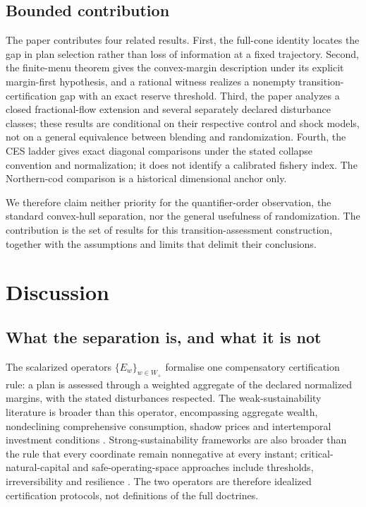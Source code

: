 \documentclass[preprint,11pt,authoryear]{elsarticle}
\theoremstyle{definition}
\theoremstyle{remark}
\newcommand{\Wp}{W_+}
\begin{document}
\subsection{Bounded contribution}

The paper contributes four related results. First, the full-cone identity locates the gap in plan selection rather than loss of information at a fixed trajectory. Second, the finite-menu theorem gives the convex-margin description under its explicit margin-first hypothesis, and a rational witness realizes a nonempty transition-certification gap with an exact reserve threshold. Third, the paper analyzes a closed fractional-flow extension and several separately declared disturbance classes; these results are conditional on their respective control and shock models, not on a general equivalence between blending and randomization. Fourth, the CES ladder gives exact diagonal comparisons under the stated collapse convention and normalization; it does not identify a calibrated fishery index. The Northern-cod comparison is a historical dimensional anchor only.

We therefore claim neither priority for the quantifier-order observation, the standard convex-hull separation, nor the general usefulness of randomization. The contribution is the set of results for this transition-assessment construction, together with the assumptions and limits that delimit their conclusions.

\section{Discussion}\label{sec:discussion}

\subsection{What the separation is, and what it is not}\label{sec:scope}

The scalarized operators $\{E_w\}_{w\in\Wp}$ formalise one compensatory certification rule: a plan is assessed through a weighted aggregate of the declared normalized margins, with the stated disturbances respected. The weak-sustainability literature is broader than this operator, encompassing aggregate wealth, nondeclining comprehensive consumption, shadow prices and intertemporal investment conditions \citep{Solow1974,Asheim1994,DasguptaMaler2000,Neumayer2013}. Strong-sustainability frameworks are also broader than the rule that every coordinate remain nonnegative at every instant; critical-natural-capital and safe-operating-space approaches include thresholds, irreversibility and resilience \citep{Ekins2003,Rockstrom2009,Raworth2012,DoyenGajardo2020}. The two operators are therefore idealized certification protocols, not definitions of the full doctrines.
\end{document}
